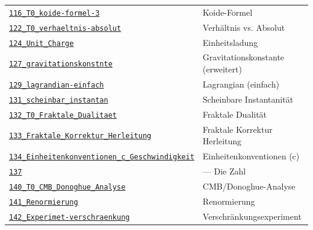 {\begin{longtable}{@{}>{\raggedright\arraybackslash}p{} >{\raggedright\arraybackslash}p{}@{}}
\href{https://github.com/jpascher/T0-Time-Mass-Duality/blob/main/2/pdf/116_T0_koide-formel-3_De.pdf}{\texttt{116\_T0\_koide-formel-3}} & Koide-Formel \\
\href{https://github.com/jpascher/T0-Time-Mass-Duality/blob/main/2/pdf/122_T0_verhaeltnis-absolut_De.pdf}{\texttt{122\_T0\_verhaeltnis-absolut}} & Verhältnis vs. Absolut \\
\href{https://github.com/jpascher/T0-Time-Mass-Duality/blob/main/2/pdf/124_Unit_Charge_De.pdf}{\texttt{124\_Unit\_Charge}} & Einheitsladung \\
\href{https://github.com/jpascher/T0-Time-Mass-Duality/blob/main/2/pdf/127_gravitationskonstnte_De.pdf}{\texttt{127\_gravitationskonstnte}} & Gravitationskonstante (erweitert) \\
\href{https://github.com/jpascher/T0-Time-Mass-Duality/blob/main/2/pdf/129_lagrandian-einfach_De.pdf}{\texttt{129\_lagrandian-einfach}} & Lagrangian (einfach) \\
\href{https://github.com/jpascher/T0-Time-Mass-Duality/blob/main/2/pdf/131_scheinbar_instantan_De.pdf}{\texttt{131\_scheinbar\_instantan}} & Scheinbare Instantanität \\
\href{https://github.com/jpascher/T0-Time-Mass-Duality/blob/main/2/pdf/132_T0_Fraktale_Dualitaet_De.pdf}{\texttt{132\_T0\_Fraktale\_Dualitaet}} & Fraktale Dualität \\
\href{https://github.com/jpascher/T0-Time-Mass-Duality/blob/main/2/pdf/133_Fraktale_Korrektur_Herleitung_De.pdf}{\texttt{133\_Fraktale\_Korrektur\_Herleitung}} & Fraktale Korrektur Herleitung \\
\href{https://github.com/jpascher/T0-Time-Mass-Duality/blob/main/2/pdf/134_Einheitenkonventionen_c_Geschwindigkeit_De.pdf}{\texttt{134\_Einheitenkonventionen\_c\_Geschwindigkeit}} & Einheitenkonventionen (c) \\
\href{https://github.com/jpascher/T0-Time-Mass-Duality/blob/main/2/pdf/137_De.pdf}{\texttt{137}} & 137 — Die Zahl \\
\href{https://github.com/jpascher/T0-Time-Mass-Duality/blob/main/2/pdf/140_T0_CMB_Donoghue_Analyse_De.pdf}{\texttt{140\_T0\_CMB\_Donoghue\_Analyse}} & CMB/Donoghue-Analyse \\
\href{https://github.com/jpascher/T0-Time-Mass-Duality/blob/main/2/pdf/141_Renormierung_De.pdf}{\texttt{141\_Renormierung}} & Renormierung \\
\href{https://github.com/jpascher/T0-Time-Mass-Duality/blob/main/2/pdf/142_Experimet-verschraenkung_De.pdf}{\texttt{142\_Experimet-verschraenkung}} & Verschränkungsexperiment \\

\end{longtable}}
